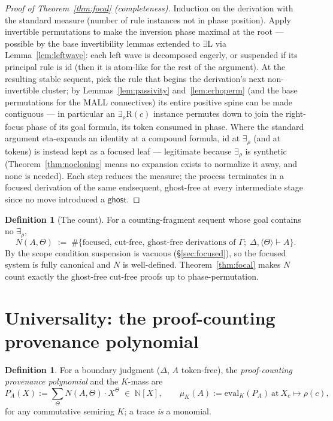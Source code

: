 \documentclass[11pt]{article}
\newcommand{\NN}{\mathbb{N}}                     %
\newcommand{\trz}[1]{\langle #1\rangle}            %
\newcommand{\Tr}{\Theta}                           %
\newcommand{\ghost}{\mathsf{ghost}}
\newcommand{\seq}[3]{#1;\;#2\vdash #3}             %
\theoremstyle{definition}
\newtheorem{definition}[theorem]{Definition}
\theoremstyle{remark}
\begin{document}
\begin{proof}[Proof of Theorem~\ref{thm:focal} (completeness)]
Induction on the derivation with the standard measure (number of rule
instances not in phase position).  Apply invertible permutations to
make the inversion phase maximal at the root --- possible by the base
invertibility lemmas extended to $\exists$L via
Lemma~\ref{lem:leftwave}: each left wave is decomposed eagerly, or
suspended if its principal rule is id (then it is atom-like for the
rest of the argument).  At the resulting stable sequent, pick the rule
that begins the derivation's next non-invertible cluster; by
Lemmas~\ref{lem:passivity} and~\ref{lem:erhoperm} (and the base
permutations for the MALL connectives) its entire positive spine can
be made contiguous --- in particular an $\exists_\rho$R$(c)$ instance
permutes down to join the right-focus phase of its goal formula, its
token consumed in phase.  Where the standard argument eta-expands an
identity at a compound formula, id at $\exists_\rho$ (and at tokens) is
instead kept as a focused leaf --- legitimate because $\exists_\rho$ is
synthetic (Theorem~\ref{thm:nocloning} means no expansion exists to
normalize it away, and none is needed).  Each step reduces the
measure; the process terminates in a focused derivation of the same
endsequent, ghost-free at every intermediate stage since no move
introduced a $\ghost$.
\end{proof}

\begin{definition}[The count]\label{def:count}
For a counting-fragment sequent whose goal contains no
$\exists_\rho$,
\[
  N(A,\Tr) \;:=\;
  \#\{\text{focused, cut-free, ghost-free derivations of }
  \seq{\Gamma}{\Delta,\trz\Tr}{A}\}.
\]
By the scope condition suspension is vacuous
(\S\ref{sec:focused}), so the focused system is fully canonical and
$N$ is well-defined.  Theorem~\ref{thm:focal} makes $N$ count exactly
the ghost-free cut-free proofs up to phase-permutation.
\end{definition}

\section{Universality: the proof-counting provenance polynomial}
\label{sec:bridge}

\begin{definition}\label{def:poly}
For a boundary judgment ($\Delta$, $A$ token-free), the
\emph{proof-counting provenance polynomial} and the $K$-mass are
\[
  P_A(X) := \sum_{\Tr} N(A,\Tr)\cdot X^{\Tr} \;\in\; \NN[X],
  \qquad
  \mu_K(A) := \mathrm{eval}_K(P_A)\ \text{at}\ X_c \mapsto \rho(c),
\]
for any commutative semiring $K$; a trace \emph{is} a monomial.
\end{definition}
\end{document}
